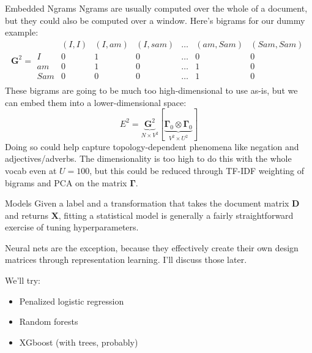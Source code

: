 \documentclass[10pt]{beamer}
\begin{document}
\begin{frame}{Embedded Ngrams}
Ngrams are usually computed over the whole of a document, but they could also be computed over a window.  Here's bigrams for our dummy example:
\[\bm{G}^2 = {\displaystyle
\begin{array}{c|cccccc}
     & (I,I) & (I, am) & (I, sam) & \hdots & (am, Sam) & (Sam, Sam)\\
     \hline
I    & 0 & 1 & 0 & \hdots & 0 & 0\\
am   & 0 & 1 & 0 & \hdots & 1 & 0\\
Sam  & 0 & 0 & 0 & \hdots & 1 & 0\\
\end{array}}
\]
These bigrams are going to be much too high-dimensional to use as-is, but we can embed them into a lower-dimensional space:
\[
E^2 = \underbrace{\bm{G}^2}_{N\times V^2}\left[\underbrace{\bm{\Gamma}_0\otimes \bm{\Gamma}_0}_{V^2 \times U^2}\right]
\]
Doing so could help capture topology-dependent phenomena like negation and adjectives/adverbs.  The dimensionality is too high to do this with the whole vocab even at $U = 100$, but this could be reduced through TF-IDF weighting of bigrams and PCA on the matrix $\bm\Gamma$.
\end{frame}

\begin{frame}{Models}
Given a label and a transformation that takes the document matrix $\bm{D}$ and returns $\bm{X}$, fitting a statistical model is generally a fairly straightforward exercise of tuning hyperparameters.  

Neural nets are the exception, because they effectively create their own design matrices through representation learning.  I'll discuss those later.

We'll try:
\begin{itemize}
\item Penalized logistic regression
\item Random forests
\item XGboost (with trees, probably)
\end{itemize}
\end{frame}
\end{document}
